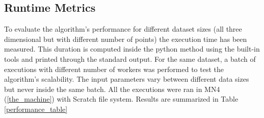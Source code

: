 \documentclass[10pt,journal,compsoc]{IEEEtran}
\begin{document}
\subsection{Runtime Metrics} \label{subsec:metrics}

To evaluate the algorithm's performance for different dataset sizes (all three dimensional but with different number of points) the execution time has been measured. This duration is computed inside the python method using the built-in tools and printed through the standard output. For the same dataset, a batch of executions with different number of workers was performed to test the algorithm's scalability. The input parameters vary between different data sizes but never inside the same batch. All the executions were ran in MN4 (\ref{the_machine}) with Scratch file system. Results are summarized in Table \ref{performance_table}
\end{document}
